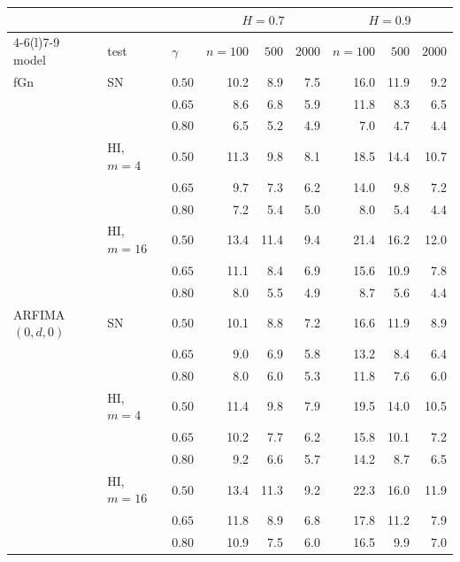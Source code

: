 \begin{tabular}{@{}lllrrrrrr@{}}\toprule
 & & & \multicolumn{3}{c}{$H=0.7$} & \multicolumn{3}{c}{$H=0.9$}\\\cmidrule(lr){4-6}\cmidrule(l){7-9}
model & test & $\gamma$ & $n=100$ & $500$ & $2000$ & $n=100$ & $500$ & $2000$\\\midrule
fGn & SN & $0.50$ & 10.2 & 8.9 & 7.5 & 16.0 & 11.9 & 9.2\\
 &  & $0.65$ & 8.6 & 6.8 & 5.9 & 11.8 & 8.3 & 6.5\\
 &  & $0.80$ & 6.5 & 5.2 & 4.9 & 7.0 & 4.7 & 4.4\\
 & HI, $m=4$ & $0.50$ & 11.3 & 9.8 & 8.1 & 18.5 & 14.4 & 10.7\\
 &  & $0.65$ & 9.7 & 7.3 & 6.2 & 14.0 & 9.8 & 7.2\\
 &  & $0.80$ & 7.2 & 5.4 & 5.0 & 8.0 & 5.4 & 4.4\\
 & HI, $m=16$ & $0.50$ & 13.4 & 11.4 & 9.4 & 21.4 & 16.2 & 12.0\\
 &  & $0.65$ & 11.1 & 8.4 & 6.9 & 15.6 & 10.9 & 7.8\\
 &  & $0.80$ & 8.0 & 5.5 & 4.9 & 8.7 & 5.6 & 4.4\\
\midrule
ARFIMA$(0,d,0)$ & SN & $0.50$ & 10.1 & 8.8 & 7.2 & 16.6 & 11.9 & 8.9\\
 &  & $0.65$ & 9.0 & 6.9 & 5.8 & 13.2 & 8.4 & 6.4\\
 &  & $0.80$ & 8.0 & 6.0 & 5.3 & 11.8 & 7.6 & 6.0\\
 & HI, $m=4$ & $0.50$ & 11.4 & 9.8 & 7.9 & 19.5 & 14.0 & 10.5\\
 &  & $0.65$ & 10.2 & 7.7 & 6.2 & 15.8 & 10.1 & 7.2\\
 &  & $0.80$ & 9.2 & 6.6 & 5.7 & 14.2 & 8.7 & 6.5\\
 & HI, $m=16$ & $0.50$ & 13.4 & 11.3 & 9.2 & 22.3 & 16.0 & 11.9\\
 &  & $0.65$ & 11.8 & 8.9 & 6.8 & 17.8 & 11.2 & 7.9\\
 &  & $0.80$ & 10.9 & 7.5 & 6.0 & 16.5 & 9.9 & 7.0\\
\bottomrule\end{tabular}
